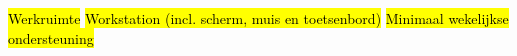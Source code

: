 \begin{outline}
  \1 \hl{Werkruimte}
  \1 \hl{Workstation (incl. scherm, muis en toetsenbord)}
  \1 \hl{Minimaal wekelijkse ondersteuning}
\end{outline}